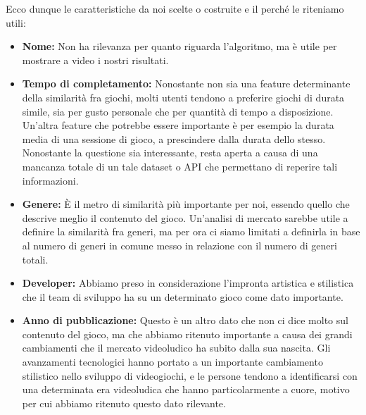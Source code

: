             Ecco dunque le caratteristiche da noi scelte o costruite e il perché le riteniamo utili:
            \begin{itemize}
                \item \textbf{Nome:} Non ha rilevanza per quanto riguarda l'algoritmo, ma è utile per mostrare a video i nostri risultati.
                
                \item \textbf{Tempo di completamento:} Nonostante non sia una feature determinante della similarità fra giochi, molti utenti tendono a preferire giochi di durata simile, sia per gusto personale che per quantità di tempo a disposizione. Un'altra feature che potrebbe essere importante è per esempio la durata media di una sessione di gioco, a prescindere dalla durata dello stesso. Nonostante la questione sia interessante, resta aperta a causa di una mancanza totale di un tale dataset o API che permettano di reperire tali informazioni.
                
                \item \textbf{Genere:} È il metro di similarità più importante per noi, essendo quello che descrive meglio il contenuto del gioco. Un'analisi di mercato sarebbe utile a definire la similarità fra generi, ma per ora ci siamo limitati a definirla in base al numero di generi in comune messo in relazione con il numero di generi totali.
                
                \item \textbf{Developer:} Abbiamo preso in considerazione l'impronta artistica e stilistica che il team di sviluppo ha su un determinato gioco come dato importante.
                
                \item \textbf{Anno di pubblicazione:} Questo è un altro dato che non ci dice molto sul contenuto del gioco, ma che abbiamo ritenuto importante a causa dei grandi cambiamenti che il mercato videoludico ha subito dalla sua nascita. Gli avanzamenti tecnologici hanno portato a un importante cambiamento stilistico nello sviluppo di videogiochi, e le persone tendono a identificarsi con una determinata era videoludica che hanno particolarmente a cuore, motivo per cui abbiamo ritenuto questo dato rilevante.
            \end{itemize}
            
